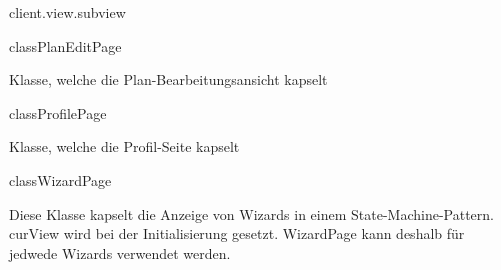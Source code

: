 \begin{texdocpackage}{client.view.subview}
\begin{texdocclass}{class}{PlanEditPage}
\label{texdoclet:edu.kit.informatik.studyplan.client.view.subview.PlanEditPage}
\begin{texdocclassintro}
Klasse, welche die Plan-Bearbeitungsansicht kapselt\end{texdocclassintro}
\begin{texdocclassconstructors}
\end{texdocclassconstructors}
\begin{texdocclassmethods}
\end{texdocclassmethods}
\end{texdocclass}


\begin{texdocclass}{class}{ProfilePage}
\label{texdoclet:edu.kit.informatik.studyplan.client.view.subview.ProfilePage}
\begin{texdocclassintro}
Klasse, welche die Profil-Seite kapselt\end{texdocclassintro}
\begin{texdocclassconstructors}
\end{texdocclassconstructors}
\begin{texdocclassmethods}
\end{texdocclassmethods}
\end{texdocclass}


\begin{texdocclass}{class}{WizardPage}
\label{texdoclet:edu.kit.informatik.studyplan.client.view.subview.WizardPage}
\begin{texdocclassintro}
Diese Klasse kapselt die Anzeige von Wizards in einem State-Machine-Pattern.
 curView wird bei der Initialisierung gesetzt. WizardPage kann deshalb für
 jedwede Wizards verwendet werden.\texdocbr{}


\end{texdocclassintro}
\end{texdocclass}
\end{texdocpackage}
